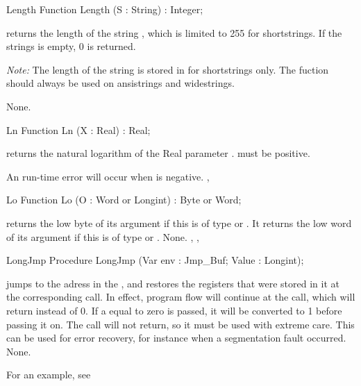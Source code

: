 
\begin{function}{Length}
\Declaration
Function Length (S : String) : Integer;

\Description
{} returns the length of the string , which is limited
to 255 for shortstrings. If the strings  is empty, 0 is returned.

{\em Note:} The length of the string  is stored in  for
shortstrings only. The  fuction should always be used on 
ansistrings and widestrings.

\Errors
None.
\SeeAlso
{}
\end{function}


\begin{function}{Ln}
\Declaration
Function Ln (X : Real) : Real;

\Description

 returns the natural logarithm of the Real parameter .
 must be positive.

\Errors
An run-time error will occur when  is negative.
\SeeAlso
{}, 
\end{function}


\begin{function}{Lo}
\Declaration
Function Lo (O : Word or Longint) : Byte or Word;

\Description
{} returns the low byte of its argument if this is of type
 or
. It returns the low word of its argument if this is of type
 or .
\Errors
None.
\SeeAlso
{}, , 
\end{function}


\begin{procedure}{LongJmp}
\Declaration
Procedure LongJmp (Var env : Jmp\_Buf; Value : Longint);

\Description

 jumps to the adress in the  ,
and restores the registers that were stored in it at the corresponding
 call.
In effect, program flow will continue at the  call, which will
return  instead of 0. If a  equal to zero is passed,
it will be converted to 1 before passing it on. The call will not return, so it must be
used with extreme care.
This can be used for error recovery, for instance when a segmentation fault
occurred.
\Errors
None.
\SeeAlso
{}
\end{procedure}
For an example, see 

